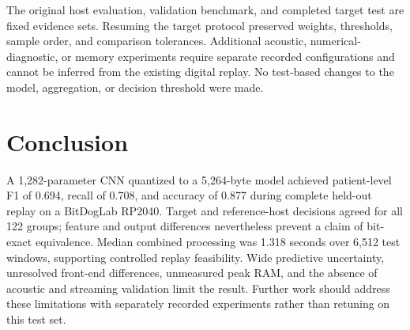 \documentclass[9pt,twocolumn,twoside,lineno]{MSBJournal}
\begin{document}
The original host evaluation, validation benchmark, and completed target test are fixed evidence sets. Resuming the target protocol preserved weights, thresholds, sample order, and comparison tolerances. Additional acoustic, numerical-diagnostic, or memory experiments require separate recorded configurations and cannot be inferred from the existing digital replay. No test-based changes to the model, aggregation, or decision threshold were made.

\section{Conclusion}
A 1,282-parameter CNN quantized to a 5,264-byte model achieved patient-level F1 of 0.694, recall of 0.708, and accuracy of 0.877 during complete held-out replay on a BitDogLab RP2040. Target and reference-host decisions agreed for all 122 groups; feature and output differences nevertheless prevent a claim of bit-exact equivalence. Median combined processing was 1.318 seconds over 6,512 test windows, supporting controlled replay feasibility. Wide predictive uncertainty, unresolved front-end differences, unmeasured peak RAM, and the absence of acoustic and streaming validation limit the result. Further work should address these limitations with separately recorded experiments rather than retuning on this test set.



\end{document}
